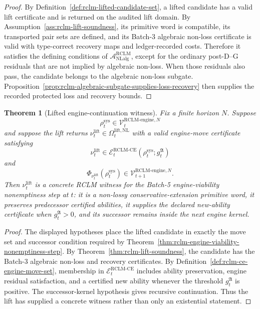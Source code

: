 \documentclass[11pt,a4paper]{article}
\newtheorem{theorem}{Theorem}[section]
\newcommand{\Acal}{\mathcal A}
\newcommand{\Vcal}{\mathcal V}
\newcommand{\RCLM}{\mathrm{RCLM}}
\newcommand{\sys}{\mathrm{sys}}
\newcommand{\engine}{\mathrm{engine}}
\newcommand{\NL}{\mathrm{NL}}
\newcommand{\NLalg}{\mathrm{NLalg}}
\newcommand{\CE}{\mathrm{CE}}
\begin{document}
\begin{proof}
By Definition~\ref{def:rclm-lifted-candidate-set}, a lifted candidate has a valid lift certificate and is returned on the audited lift domain.  By Assumption~\ref{ass:rclm-lift-soundness}, its primitive word is compatible, its transported pair sets are defined, and its Batch-3 algebraic non-loss certificate is valid with type-correct recovery maps and ledger-recorded costs.  Therefore it satisfies the defining conditions of \(\Acal_{\NLalg}^{\RCLM}\), except for the ordinary post-D--G residuals that are not implied by algebraic non-loss.  When those residuals also pass, the candidate belongs to the algebraic non-loss subgate.  Proposition~\ref{prop:rclm-algebraic-subgate-supplies-loss-recovery} then supplies the recorded protected loss and recovery bounds.
\end{proof}

\begin{theorem}[Lifted engine-continuation witness]
\label{thm:rclm-lifted-engine-continuation-witness}
Fix a finite horizon \(N\).  Suppose
\[
\rho_t^{\sys}\in\Vcal_t^{\RCLM\text{-}\engine,N}
\]
and suppose the lift returns \(\nu_t^{\mathrm{lift}}\in\Omega_t^{\mathrm{lift},\NL}\) with a valid engine-move certificate satisfying
\[
\nu_t^{\mathrm{lift}}\in
\mathcal E_t^{\RCLM\text{-}\CE}(\rho_t^{\sys};g_t^{\mathfrak A})
\]
and
\[
\Phi_{\nu_t^{\mathrm{lift}}}(\rho_t^{\sys})
\in
\Vcal_{t+1}^{\RCLM\text{-}\engine,N}.
\]
Then \(\nu_t^{\mathrm{lift}}\) is a concrete RCLM witness for the Batch-5 engine-viability nonemptiness step at \(t\): it is a non-lossy conservative-extension primitive word, it preserves predecessor certified abilities, it supplies the declared new-ability certificate when \(g_t^{\mathfrak A}>0\), and its successor remains inside the next engine kernel.
\end{theorem}

\begin{proof}
The displayed hypotheses place the lifted candidate in exactly the move set and successor condition required by Theorem~\ref{thm:rclm-engine-viability-nonemptiness-step}.  By Theorem~\ref{thm:rclm-lift-soundness}, the candidate has the Batch-3 algebraic non-loss and recovery certificates.  By Definition~\ref{def:rclm-ce-engine-move-set}, membership in \(\mathcal E_t^{\RCLM\text{-}\CE}\) includes ability preservation, engine residual satisfaction, and a certified new ability whenever the threshold \(g_t^{\mathfrak A}\) is positive.  The successor-kernel hypothesis gives recursive continuation.  Thus the lift has supplied a concrete witness rather than only an existential statement.
\end{proof}
\end{document}
